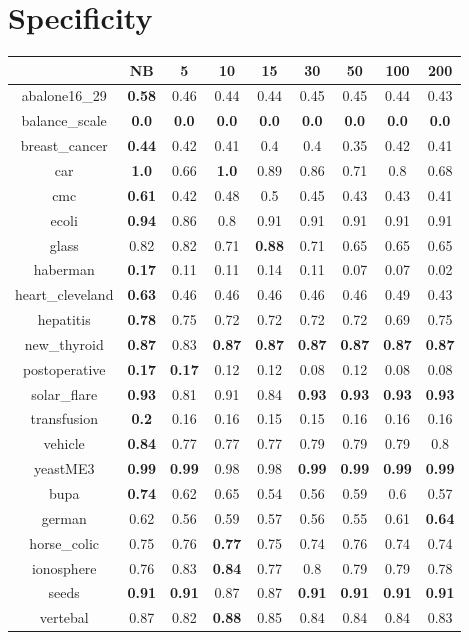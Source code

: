 \documentclass{article}%
\begin{document}
%
\section*{Specificity}%
\begin{tabular}{c|cccccccc}%
\hline%
&NB&5&10&15&30&50&100&200\\%
\hline%
abalone16\_29&\textbf{0.58}&0.46&0.44&0.44&0.45&0.45&0.44&0.43\\%
\hline%
balance\_scale&\textbf{0.0}&\textbf{0.0}&\textbf{0.0}&\textbf{0.0}&\textbf{0.0}&\textbf{0.0}&\textbf{0.0}&\textbf{0.0}\\%
\hline%
breast\_cancer&\textbf{0.44}&0.42&0.41&0.4&0.4&0.35&0.42&0.41\\%
\hline%
car&\textbf{1.0}&0.66&\textbf{1.0}&0.89&0.86&0.71&0.8&0.68\\%
\hline%
cmc&\textbf{0.61}&0.42&0.48&0.5&0.45&0.43&0.43&0.41\\%
\hline%
ecoli&\textbf{0.94}&0.86&0.8&0.91&0.91&0.91&0.91&0.91\\%
\hline%
glass&0.82&0.82&0.71&\textbf{0.88}&0.71&0.65&0.65&0.65\\%
\hline%
haberman&\textbf{0.17}&0.11&0.11&0.14&0.11&0.07&0.07&0.02\\%
\hline%
heart\_cleveland&\textbf{0.63}&0.46&0.46&0.46&0.46&0.46&0.49&0.43\\%
\hline%
hepatitis&\textbf{0.78}&0.75&0.72&0.72&0.72&0.72&0.69&0.75\\%
\hline%
new\_thyroid&\textbf{0.87}&0.83&\textbf{0.87}&\textbf{0.87}&\textbf{0.87}&\textbf{0.87}&\textbf{0.87}&\textbf{0.87}\\%
\hline%
postoperative&\textbf{0.17}&\textbf{0.17}&0.12&0.12&0.08&0.12&0.08&0.08\\%
\hline%
solar\_flare&\textbf{0.93}&0.81&0.91&0.84&\textbf{0.93}&\textbf{0.93}&\textbf{0.93}&\textbf{0.93}\\%
\hline%
transfusion&\textbf{0.2}&0.16&0.16&0.15&0.15&0.16&0.16&0.16\\%
\hline%
vehicle&\textbf{0.84}&0.77&0.77&0.77&0.79&0.79&0.79&0.8\\%
\hline%
yeastME3&\textbf{0.99}&\textbf{0.99}&0.98&0.98&\textbf{0.99}&\textbf{0.99}&\textbf{0.99}&\textbf{0.99}\\%
\hline%
bupa&\textbf{0.74}&0.62&0.65&0.54&0.56&0.59&0.6&0.57\\%
\hline%
german&0.62&0.56&0.59&0.57&0.56&0.55&0.61&\textbf{0.64}\\%
\hline%
horse\_colic&0.75&0.76&\textbf{0.77}&0.75&0.74&0.76&0.74&0.74\\%
\hline%
ionosphere&0.76&0.83&\textbf{0.84}&0.77&0.8&0.79&0.79&0.78\\%
\hline%
seeds&\textbf{0.91}&\textbf{0.91}&0.87&0.87&\textbf{0.91}&\textbf{0.91}&\textbf{0.91}&\textbf{0.91}\\%
\hline%
vertebal&0.87&0.82&\textbf{0.88}&0.85&0.84&0.84&0.84&0.83\\%
\hline%
\end{tabular}
\end{document}
